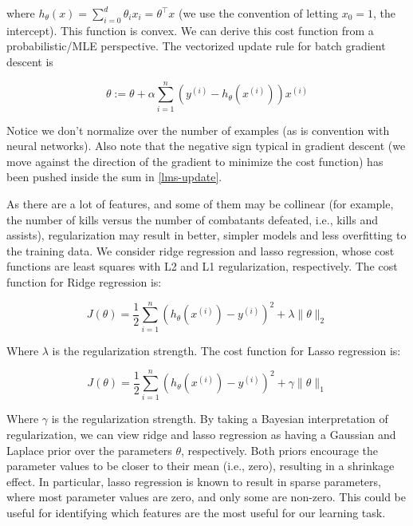\documentclass[conference]{IEEEtran}
\begin{document}
where $h_\theta(x) = \sum_{i=0}^d \theta_i x_i = \theta^\top
    x$ (we use the convention of letting
$x_0 = 1$, the intercept). This function is convex. We can derive
this cost function from a probabilistic/MLE perspective. The vectorized update
rule for batch gradient descent is

\begin{equation}
    \theta := \theta + \alpha \sum_{i=1}^n
    (y^{(i)} -
    h_\theta (x^{(i)}))x^{(i)}\label{lms-update}
\end{equation}

Notice we don't normalize over the number of examples (as is convention with
neural networks). Also note that the negative sign typical in gradient descent
(we move against the direction of the gradient to minimize the cost function)
has been pushed inside the sum in \eqref{lms-update}.

As there are a lot of features, and some of them may be collinear (for example,
the number of kills versus the number of combatants defeated, i.e., kills and
assists), regularization may result in better, simpler models and less
overfitting to the training data. We consider ridge regression and lasso
regression, whose cost functions are least squares with L2 and L1
regularization, respectively. The cost function for Ridge regression is:

\begin{equation}
    J(\theta) = \frac{1}{2} \sum_{i = 1}^n
    (h_\theta (x^{(i)}) - y^{(i)})^2 + \lambda
    \|\theta\|_2
\end{equation}

Where $\lambda$ is the regularization strength. The cost function
for Lasso regression is:

\begin{equation}
    J(\theta) = \frac{1}{2} \sum_{i = 1}^n
    (h_\theta (x^{(i)}) - y^{(i)})^2 + \gamma
    \|\theta\|_1
\end{equation}

Where $\gamma$ is the regularization strength. By taking a
Bayesian interpretation of regularization, we can view ridge and lasso
regression as having a Gaussian and Laplace prior over the parameters
$\theta$, respectively. Both priors encourage the parameter values
to be closer to their mean (i.e., zero), resulting in a shrinkage effect. In
particular, lasso regression is known to result in sparse parameters, where
most parameter values are zero, and only some are non-zero. This could be
useful for identifying which features are the most useful for our learning
task.
\end{document}
